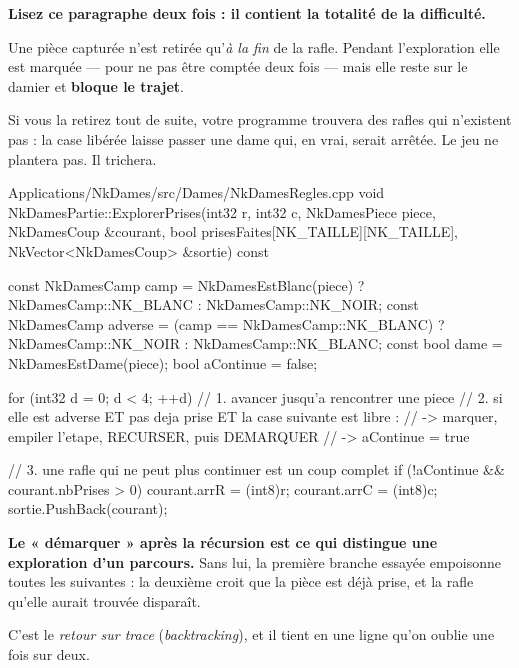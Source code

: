 \begin{nkretenir}
\textbf{Lisez ce paragraphe deux fois : il contient la totalité de la
difficulté.}

Une pièce capturée n'est retirée qu'\emph{à la fin} de la rafle. Pendant
l'exploration elle est marquée --- pour ne pas être comptée deux fois --- mais
elle reste sur le damier et \textbf{bloque le trajet}.

Si vous la retirez tout de suite, votre programme trouvera des rafles qui
n'existent pas : la case libérée laisse passer une dame qui, en vrai, serait
arrêtée. Le jeu ne plantera pas. Il trichera.
\end{nkretenir}

\begin{nkcode}{Applications/NkDames/src/Dames/NkDamesRegles.cpp}
void NkDamesPartie::ExplorerPrises(int32 r, int32 c, NkDamesPiece piece,
                                   NkDamesCoup &courant,
                                   bool prisesFaites[NK_TAILLE][NK_TAILLE],
                                   NkVector<NkDamesCoup> &sortie) const {
    const NkDamesCamp camp = NkDamesEstBlanc(piece) ? NkDamesCamp::NK_BLANC
                                                   : NkDamesCamp::NK_NOIR;
    const NkDamesCamp adverse = (camp == NkDamesCamp::NK_BLANC) ? NkDamesCamp::NK_NOIR
                                                                : NkDamesCamp::NK_BLANC;
    const bool dame = NkDamesEstDame(piece);
    bool aContinue = false;

    for (int32 d = 0; d < 4; ++d) {
        // 1. avancer jusqu'a rencontrer une piece
        // 2. si elle est adverse ET pas deja prise ET la case suivante est libre :
        //      -> marquer, empiler l'etape, RECURSER, puis DEMARQUER
        //      -> aContinue = true
    }

    // 3. une rafle qui ne peut plus continuer est un coup complet
    if (!aContinue && courant.nbPrises > 0) {
        courant.arrR = (int8)r; courant.arrC = (int8)c;
        sortie.PushBack(courant);
    }
}
\end{nkcode}

\begin{nkretenir}
\textbf{Le « démarquer » après la récursion est ce qui distingue une exploration
d'un parcours.} Sans lui, la première branche essayée empoisonne toutes les
suivantes : la deuxième croit que la pièce est déjà prise, et la rafle qu'elle
aurait trouvée disparaît.

C'est le \emph{retour sur trace} (\emph{backtracking}), et il tient en une
ligne qu'on oublie une fois sur deux.
\end{nkretenir}

